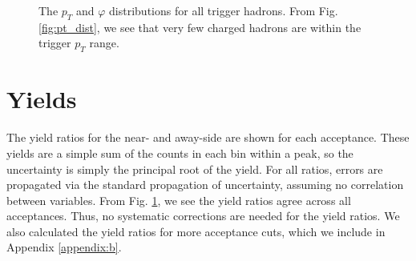 \documentclass[../main.tex]{subfiles}
\begin{document}
\FloatBarrier
\begin{figure}[h]%
    \centering
    \qquad
    \caption{The $p_T$ and $\varphi$ distributions for all trigger hadrons. From Fig. \ref{fig:pt_dist}, we see that very few charged hadrons are within the trigger $p_T$ range.}%
    \label{fig:yield_ratios}%
\end{figure}
\FloatBarrier


\section{Yields}
The yield ratios for the near- and away-side are shown for each acceptance. These yields are a simple sum of the counts in each bin within a peak, so the uncertainty is simply the principal root of the yield. For all ratios, errors are propagated via the standard propagation of uncertainty, assuming no correlation between variables. From Fig. \ref{fig:yield_ratios}, we see the yield ratios agree across all acceptances. Thus, no systematic corrections are needed for the yield ratios. We also calculated the yield ratios for more acceptance cuts, which we include in Appendix \ref{appendix:b}. 
\end{document}
